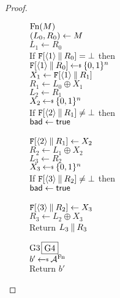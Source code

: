 \begin{proof}
\begin{figure}[t]
{\underline{$\textnormal{Fn}(M)$}\\
$(L_0, R_0) \gets M$\\
$L_1 \gets R_0$\\
If $\mathtt{F}[\langle1\rangle\: \| \: R_0] = \bot$ then\\
\ind $\TabF[\langle1\rangle\concat R_0] \getsr \bits^n$\\
$X_1 \gets \mathtt{F}[\langle1\rangle\: \| \: R_1]$\\
$R_1 \gets L_0 \oplus X_1$\\
$L_2 \gets R_1$\\
$X_2 \getsr \bits^n$\\
If $\mathtt{F}[\langle2\rangle\: \| \: R_1] \ne \bot$ then\\
\ind $\mathsf{bad}\gets\mathsf{true}$\\
\ind {}\\
$\mathtt{F}[\langle2\rangle\: \| \: R_1] \gets X_2$\\
$R_2 \gets L_1 \oplus X_2$\\
$L_3 \gets R_2$\\
$X_3 \getsr \bits^n$\\
If $\mathtt{F}[\langle3\rangle\: \| \: R_2] \ne \bot$ then\\
\ind $\mathsf{bad}\gets\mathsf{true}$\\
\ind {}\\
$\mathtt{F}[\langle3\rangle\: \| \: R_2] \gets X_3$\\
$R_3 \gets L_2 \oplus X_3$\\
Return $L_3 \: \| \: R_3$
}{
\underline{${{\textnormal G}}3$\;\;\;$\fbox{{{\textnormal G}}4}$}\\[2pt]
$b' \getsr \advA^\Fn$\\
Return $b'$\medskip

}
\end{figure}
\end{proof}
